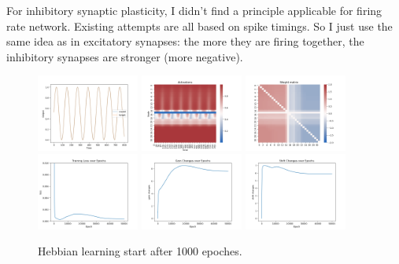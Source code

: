 \documentclass[12pt, a4paper]{article}
\begin{document}
For inhibitory synaptic plasticity, I didn't find a principle applicable for firing rate network. Existing attempts are all based on spike timings. So I just use the same idea as in excitatory synapses: the more they are firing together, the inhibitory synapses are stronger (more negative).

\begin{figure}[H]
    \centering
    \includegraphics[width=0.3\textwidth]{analysis/fig/0122_SIN2_bphebbpt_output.png}
    \includegraphics[width=0.3\textwidth]{analysis/fig/0122_SIN2_bphebbpt_activations.png}
    \includegraphics[width=0.3\textwidth]{analysis/fig/0122_SIN2_bphebbpt_weight_matrix.png}\\
    \includegraphics[width=0.3\textwidth]{analysis/fig/0122_SIN2_bphebbpt_loss.png}
    \includegraphics[width=0.3\textwidth]{analysis/fig/0122_SIN2_bphebbpt_gc.png}
    \includegraphics[width=0.3\textwidth]{analysis/fig/0122_SIN2_bphebbpt_sc.png}\\
    \caption{Hebbian learning start after 1000 epoches.}
\end{figure}
\end{document}
